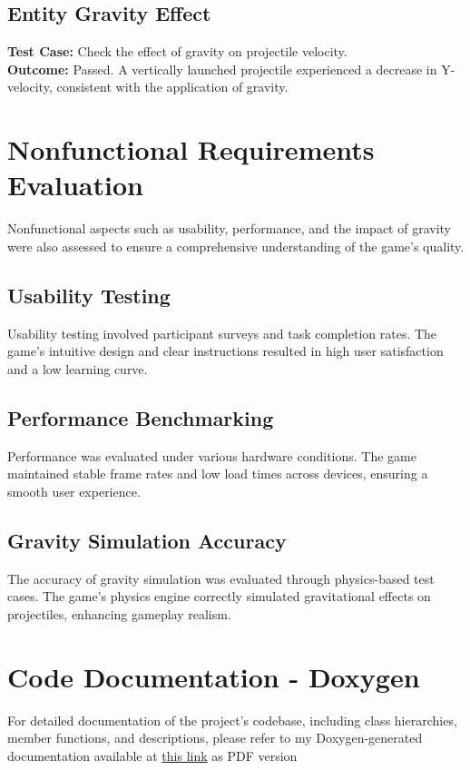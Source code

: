 \documentclass[12pt]{article}
\begin{document}
\subsection{Entity Gravity Effect}
\textbf{Test Case:} Check the effect of gravity on projectile velocity. \\
\textbf{Outcome:} Passed. A vertically launched projectile experienced a decrease in Y-velocity, consistent with the application of gravity.

\FloatBarrier
\section{Nonfunctional Requirements Evaluation}

Nonfunctional aspects such as usability, performance, and the impact of gravity were also assessed to ensure a comprehensive understanding of the game's quality.

\subsection{Usability Testing}
Usability testing involved participant surveys and task completion rates. The game's intuitive design and clear instructions resulted in high user satisfaction and a low learning curve.

\subsection{Performance Benchmarking}
Performance was evaluated under various hardware conditions. The game maintained stable frame rates and low load times across devices, ensuring a smooth user experience.

\subsection{Gravity Simulation Accuracy}
The accuracy of gravity simulation was evaluated through physics-based test cases. The game's physics engine correctly simulated gravitational effects on projectiles, enhancing gameplay realism.

\section{Code Documentation - Doxygen}
For detailed documentation of the project's codebase, including class hierarchies, member functions, and descriptions, please refer to my Doxygen-generated documentation available at \href{https://github.com/XessX/Angry_Bird_Alike/blob/main/latex/refman.pdf}{this link} as PDF version
\end{document}
